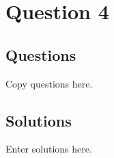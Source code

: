 \chapter{Question 4}
\section{Questions}
Copy questions here.

\section{Solutions}
Enter solutions here.
